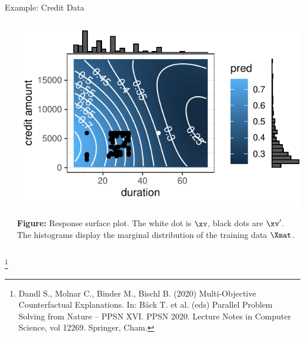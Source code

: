 \documentclass[11pt,compress,t,notes=noshow, xcolor=table]{beamer}
\begin{document}
\begin{vbframe}{Example: Credit Data}
\begin{columns}
\begin{column}{0.5\textwidth}
		\end{column}
		\begin{column}{0.5\textwidth}
			\begin{center}
				\includegraphics[width=1\textwidth]{figure/counterfactuals_credit_heat}
			\end{center}
		\vspace{-0.2cm}
			\scriptsize{\textbf{Figure:} Response surface plot. 
				The white dot is $\xv$, black dots are $\xv'$. The histograms display the marginal distribution of the training data $\Xmat$.} 
				
		\end{column}
	\end{columns}
\footnote[frame]{Dandl S., Molnar C., Binder M., Bischl B. (2020) Multi-Objective Counterfactual Explanations. In: Bäck T. et al. (eds) Parallel Problem Solving from Nature – PPSN XVI. PPSN 2020. Lecture Notes in Computer Science, vol 12269. Springer, Cham.}
\end{vbframe}
\end{document}
